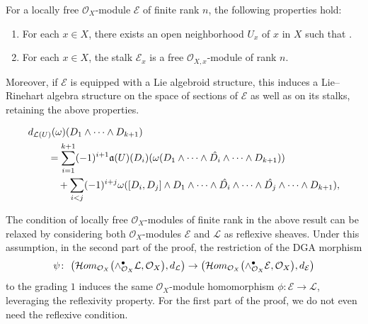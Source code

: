 \documentclass[10pt,a4paper]{amsart}
\begin{document}
\begin{Rem} \label{loc free f.r.}
	For a locally free $\mathcal{O}_X$-module $\mathcal{E}$ of finite rank $n$, the following properties hold:%
	\begin{enumerate}\itemsep=0pt
		\item For each $x \in X$, there exists an open neighborhood $U_x$ of $x$ in $X$ such that .
		\item For each $x \in X$, the stalk $\mathcal{E}_x$ is a free $\mathcal{O}_{X,x}$-module of rank $n$.
	\end{enumerate}
	Moreover, if $\mathcal{E}$ is equipped with a Lie algebroid structure, this induces a Lie--Rinehart algebra structure on the space of sections of $\mathcal{E}$ as well as on its stalks, retaining the above properties.
\end{Rem}

\begin{align}
&{\rm d}_{\mathcal{L}(U)}(\omega)(D_1\wedge \cdots \wedge D_{k+1}) \nonumber\\
& \qquad = \sum^{k+1}_{i=1}(-1)^{i+1}\mathfrak{a}(U)(D_i)(\omega(D_1\wedge \cdots \wedge \hat{D_i} \wedge \cdots \wedge D_{k+1}))\nonumber\\
&\qquad\quad + \sum_{i< j}(-1)^{i+j}\omega([D_i, D_j]\wedge D_1\wedge \cdots \wedge \hat{D_i}\wedge \cdots \wedge \hat{D_j}\wedge \cdots \wedge D_{k+1}),\label{C-E-D differential}
\end{align}

\begin{Rem} \label{dga-reflexive}
	The condition of locally free $\mathcal{O}_X$-modules of finite rank in the above result can be relaxed by considering both $\mathcal{O}_X$-modules $\mathcal{E}$ and $\mathcal{L}$ as reflexive sheaves. Under this assumption, in the second part of the proof, the restriction of the DGA morphism
\[
\psi\colon \ \bigl(\mathcal{H}{\rm om}_{\mathcal{O}_X}\bigl(\wedge^\bullet_{\mathcal{O}_X}\mathcal{L}, \mathcal{O}_X\bigr), {\rm d}_{\mathcal{L}}\bigr) \rightarrow \bigl(\mathcal{H}{\rm om}_{\mathcal{O}_X}\bigl(\wedge^\bullet_{\mathcal{O}_X}\mathcal{E}, \mathcal{O}_X\bigr), {\rm d}_{\mathcal{E}}\bigr)
\]
 to the grading $1$ induces the same $\mathcal{O}_X$-module homomorphism $\phi\colon \mathcal{E} \rightarrow \mathcal{L}$, leveraging the reflexivity property. For the first part of the proof, we do not even need the reflexive condition.
\end{Rem}
\end{document}
